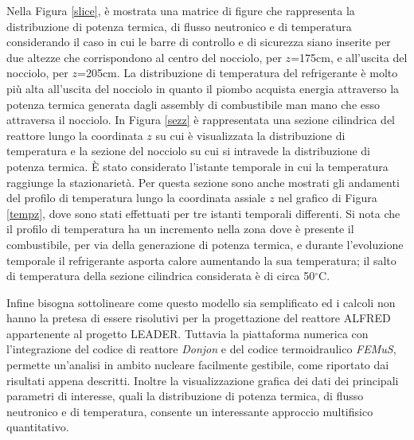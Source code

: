 Nella Figura \ref{slice}, è mostrata una matrice di figure che rappresenta la 
distribuzione di potenza termica, di flusso neutronico e di temperatura 
considerando il caso in cui le barre di controllo e di sicurezza siano inserite 
per due altezze che corrispondono al centro del nocciolo, per $z$=175cm, e 
all'uscita del nocciolo, per $z$=205cm.
La distribuzione di temperatura del refrigerante è molto più alta all'uscita del 
nocciolo in quanto il piombo acquista energia attraverso la potenza termica 
generata dagli assembly di combustibile man mano che esso attraversa il 
nocciolo.
In Figura \ref{sezz} è rappresentata una sezione cilindrica del reattore
lungo la coordinata $z$ su cui è visualizzata la distribuzione di temperatura
e la sezione del nocciolo su cui si intravede la distribuzione di potenza 
termica. \`E  stato considerato l'istante temporale in cui la temperatura raggiunge la stazionarietà.
Per questa sezione sono anche mostrati gli andamenti del profilo di temperatura lungo la coordinata 
assiale $z$ nel grafico di Figura \ref{tempz}, dove sono stati effettuati per tre istanti temporali 
differenti. Si nota che il profilo di temperatura ha un incremento nella zona dove è presente il
combustibile, per via della generazione di potenza termica, e durante l'evoluzione temporale il 
refrigerante asporta calore aumentando la sua temperatura; il salto di temperatura della 
sezione cilindrica considerata è di circa 50$^\circ$C.

Infine bisogna sottolineare come questo modello sia semplificato ed i calcoli
non hanno la pretesa di essere risolutivi per la progettazione del reattore ALFRED
appartenente al progetto LEADER. Tuttavia la piattaforma numerica con l'integrazione del
codice di reattore \textit{Donjon} e del codice termoidraulico \textit{FEMuS}, 
permette un'analisi in ambito nucleare facilmente gestibile, 
come riportato dai risultati appena descritti. Inoltre la visualizzazione grafica dei dati dei 
principali parametri di interesse, quali la distribuzione di potenza termica, di flusso neutronico
e di temperatura, consente un interessante approccio multifisico quantitativo.




